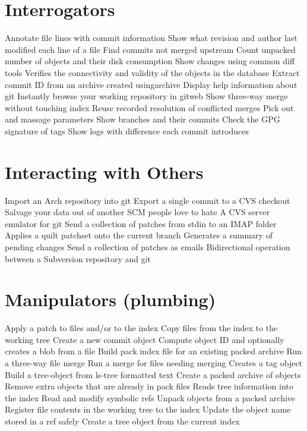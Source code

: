 \section{Interrogators}
	{Annotate file lines with commit information}
	{\emergencystretch=5pt Show what revision and author last modified each line of a file}
	{Find commits not merged upstream}
	{Count unpacked number of objects and their disk consumption}
	{Show changes using common diff tools}
	{Verifies the connectivity and validity of the objects in the database}
	{Extract commit ID from an archive created usingarchive}
	{Display help information about git}
	{Instantly browse your working repository in gitweb}
	{Show three-way merge without touching index}
	{Reuse recorded resolution of conflicted merges}
	{Pick out and massage parameters}
	{Show branches and their commits}
	{Check the GPG signature of tags}
	{Show logs with difference each commit introduces}

\section{Interacting with Others}
	{Import an Arch repository into git}
	{Export a single commit to a CVS checkout}
	{Salvage your data out of another SCM people love to hate}
	{A CVS server emulator for git}
	{Send a collection of patches from stdin to an IMAP folder}
	{Applies a quilt patchset onto the current branch}
	{Generates a summary of pending chan\-ges}
	{Send a collection of patches as emails}
	{Bidirectional operation between a Subversion repository and git}

\section{Manipulators (plumbing)}
	{Apply a patch to files and/or to the index}
	{Copy files from the index to the working tree}
	{Create a new commit object}
	{Compute object ID and optionally creates a blob from a file}
	{Build pack index file for an existing packed archive}
	{Run a three-way file merge}
	{Run a merge for files needing merging}
	{Creates a tag object}
	{Build a tree-object from ls-tree formatted text}
	{Create a packed archive of objects}
	{Remove extra objects that are already in pack files}
	{Reads tree information into the index}
	{Read and modify symbolic refs}
	{Unpack objects from a packed archive}
	{Register file contents in the working tree to the index}
	{Update the object name stored in a ref safely}
	{Create a tree object from the current index}

